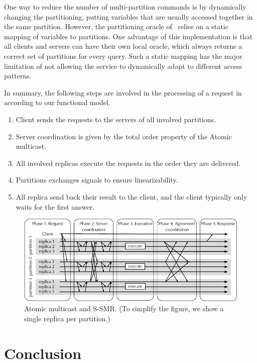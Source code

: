 One way to reduce the number of multi-partition commands is by dynamically
changing the partitioning, putting variables that are usually accessed together
in the same partition. However, the partitioning oracle of \ssmr\ relies on a
static mapping of variables to partitions. One advantage of this implementation
is that all clients and servers can have their own local oracle, which always
returns a correct set of partitions for every query. Such a static mapping has
the major limitation of not allowing the service to dynamically adapt to
different access patterns.

In summary, the following steps are involved in the processing of a request in
\ssmr\, according to our functional model.

\begin{enumerate}
  \item Client sends the requests to the servers of all involved partitions.
  \item Server coordination is given by the total order property of the Atomic
  multicast.
  \item All involved replicas execute the requests in the order they are delivered.
  \item Partitions exchanges signals to ensure linearizability.
  \item All replica send back their result to the client, and the client
  typically only waits for the first answer.
\end{enumerate}

\begin{figure}
  \begin{minipage}[b]{1.0\linewidth}
  \centering
        \includegraphics[width=1\linewidth]{figures/coordination-ssmr}
  \end{minipage}
  \caption{Atomic multicast and S-SMR. (To simplify the figure, we show a single replica per partition.)}
  \label{fig:coordination-ssmr}
\end{figure}

\section{Conclusion}


